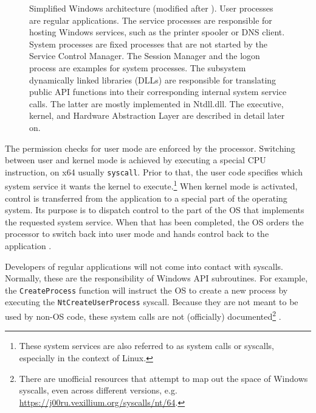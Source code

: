 \begin{figure}[htb!]
	\caption[
		Simplified Windows architecture
	]{
		Simplified Windows architecture (modified after \cite{Yosifovich2017}).
		User processes are regular applications. The service processes are responsible for hosting Windows services, such as the printer spooler or DNS client. System processes are fixed processes that are not started by the Service Control Manager. The Session Manager and the logon process are examples for system processes.
		The subsystem dynamically linked libraries (DLLs) are responsible for translating public API functions into their corresponding internal system service calls. The latter are mostly implemented in Ntdll.dll.
		The executive, kernel, and Hardware Abstraction Layer are described in detail later on. 
	}
	\label{fig:background.kerneldriver.winarchitecture}
\end{figure}

The permission checks for user mode are enforced by the processor. Switching between user and kernel mode is achieved by executing a special CPU instruction, on x64 usually \texttt{syscall}. Prior to that, the user code specifies which system service it wants the kernel to execute.\footnote{\label{fn:background.kerneldriver.syscalls} These system services are also referred to as system calls or syscalls, especially in the context of Linux.} When kernel mode is activated, control is transferred from the application to a special part of the operating system. Its purpose is to dispatch control to the part of the OS that implements the requested system service. When that has been completed, the OS orders the processor to switch back into user mode and hands control back to the application \cite{Yosifovich2017}.

Developers of regular applications will not come into contact with syscalls. Normally, these are the responsibility of Windows API subroutines. For example, the \texttt{CreateProcess} function will instruct the OS to create a new process by executing the \texttt{NtCreateUserProcess} syscall. Because they are not meant to be used by non-OS code, these system calls are not (officially) documented\footnote{\label{fn:background.kerneldriver.syscalldoc} There are unofficial resources that attempt to map out the space of Windows syscalls, even across different versions, e.g. \url{https://j00ru.vexillium.org/syscalls/nt/64}.} \cite{Yosifovich2017}.

